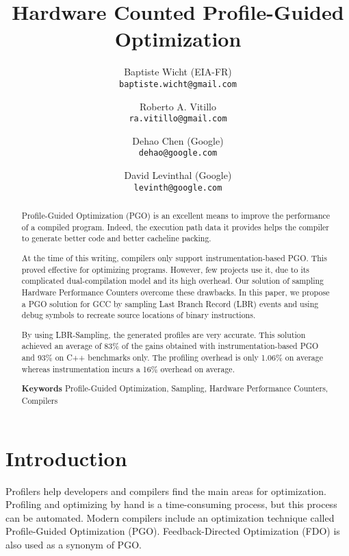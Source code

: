 \documentclass[9pt,english,twocolumn,letter]{article}
\begin{document}
\author{
    Baptiste Wicht (EIA-FR)\\
    \texttt{baptiste.wicht@gmail.com}
    \and
    Roberto A. Vitillo\\
    \texttt{ra.vitillo@gmail.com}
    \and
    Dehao Chen (Google)\\
    \texttt{dehao@google.com}
    \and
    David Levinthal (Google)\\
    \texttt{levinth@google.com}
}
\title{\bf Hardware Counted Profile-Guided Optimization}
\date{}

\maketitle

\begin{abstract}

Profile-Guided Optimization (PGO) is an excellent means to improve the performance of a compiled program. Indeed, the execution path data it provides helps the compiler to generate better code and better cacheline packing.

At the time of this writing, compilers only support instrumentation-based PGO. This proved effective for optimizing programs. However, few projects use it, due to its complicated dual-compilation model and its high overhead. Our solution of sampling Hardware Performance Counters overcome these drawbacks. In this paper, we propose a PGO solution for GCC by sampling Last Branch Record (LBR) events and using debug symbols to recreate source locations of binary instructions.

By using LBR-Sampling, the generated profiles are very accurate. This solution achieved an average of 83\% of the gains obtained with instrumentation-based PGO and 93\% on C++ benchmarks only. The profiling overhead is only 1.06\% on average whereas instrumentation incurs a 16\% overhead on average.

\vspace{5mm}

\textbf{Keywords} Profile-Guided Optimization, Sampling, Hardware Performance Counters, Compilers

\end{abstract}

\section{Introduction}

Profilers help developers and compilers find the main areas for optimization. Profiling and optimizing by hand is a time-consuming process, but this process can be automated. Modern compilers include an optimization technique called Profile-Guided Optimization (PGO). Feedback-Directed Optimization (FDO) is also used as a synonym of PGO.
\end{document}
